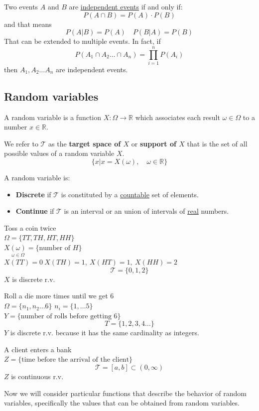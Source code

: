 \documentclass{article}
\begin{document}
\begin{definition}
    Two events $A$ and $B$ are \underline{independent events} if and only if:
    $$P(A\cap B)=P(A)\cdot P(B)$$
    and that means
    $$P(A|B)=P(A)\quad P(B|A)=P(B)$$
    That can be extended to multiple events. In fact, if
    $$P(A_1\cap A_2\ldots \cap A_n)=\prod_{i=1}^nP(A_i)$$
    then $A_1,A_2\ldots A_n$ are independent events.
\end{definition}
\subsection{Random variables}
\begin{definition}
    A random variable is a function $X:\Omega\to \mathbb{R}$ which associates
    each result $\omega\in\Omega$ to a number $x\in \mathbb{R}$.
\end{definition}
\begin{definition}
    We refer to $\mathcal{T}$ as the \textbf{target space of $X$} or
    \textbf{support of $X$} that is the set of all possible values of a random
    variable $X$.
    $$\{x|x=X(\omega),\quad\omega\in \mathbb{R}\}$$
\end{definition}
A random variable is:
\begin{itemize}
    \item \textbf{Discrete} if $\mathcal{T}$ is constituted by a
        \underline{countable} set of elements.
    \item \textbf{Continue} if $\mathcal{T}$ is an interval or an union of
       intervals of \underline{real} numbers. 
\end{itemize}
\clearpage
\begin{example}
   Toss a coin twice\\ 
   $\Omega=\{TT,TH,HT,HH\}$\\
   $X\underset{\omega\in\Omega}{(\omega)}=\{\text{number of }H\}$\\
   $X(TT)=0\ X(TH)=1,\ X(HT)=1,\ X(HH)=2$
   $$\mathcal{T}=\{0,1,2\}$$
   $X$ is discrete r.v.
\end{example}
\begin{example}
   Roll a die more times until we get 6\\ 
   $\Omega=\{n_1,n_2\ldots6\}$ $n_i=\{1,\ldots5\}$\\ 
   $Y=\{\text{number of rolls before getting 6}\}$ 
   $$T=\{1,2,3,4\ldots\}$$
   $Y$ is discrete r.v. because it has the same cardinality as integers.
\end{example}
\begin{example}
   A client enters a bank\\ 
   $Z=\{\text{time before the arrival of the client}\}$
   $$\mathcal{T}=[a,b]\subset(0,\infty)$$
   $Z$ is continuous r.v.
\end{example}
Now we will consider particular functions that describe the behavior of random
variables, specifically the values that can be obtained from random variables.
\end{document}
